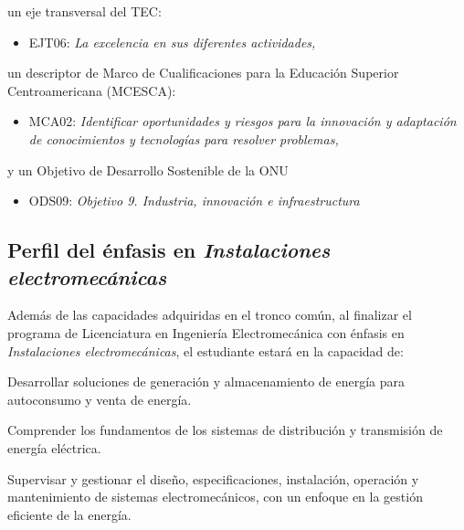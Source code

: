 un eje transversal del TEC:\par

\begin{itemize}
\item EJT06: \textit{La excelencia en sus diferentes actividades}\textit{,}
\end{itemize}
un descriptor de Marco de Cualificaciones para la Educación Superior Centroamericana (MCESCA):\par

\begin{itemize}
\item MCA02: \textit{Identificar oportunidades y riesgos para la innovación y adaptación de conocimientos y tecnologías para resolver problemas}\textit{,}
\end{itemize}
y un Objetivo de Desarrollo Sostenible de la ONU\par

\begin{itemize}
\item ODS09: \textit{Objetivo 9. Industria, innovación e infraestructura}
\end{itemize}
\subsection*{Perfil del énfasis en \textit{Instalaciones electromecánicas}}

Además de las capacidades adquiridas en el tronco común, al finalizar el programa de Licenciatura en Ingeniería Electromecánica con énfasis en \textit{Instalaciones electromecánicas}, el estudiante estará en la capacidad de:\par

\begin{cuadroazul}[INS01]
Desarrollar soluciones de generación y almacenamiento de energía para autoconsumo y venta de energía.
\end{cuadroazul}

\begin{cuadroazul}[INS02]
Comprender los fundamentos de los sistemas de distribución y transmisión de energía eléctrica.
\end{cuadroazul}

\begin{cuadroazul}[INS03]
Supervisar y gestionar el diseño, especificaciones, instalación, operación y mantenimiento de sistemas electromecánicos, con un enfoque en la gestión eficiente de la energía.
\end{cuadroazul}

